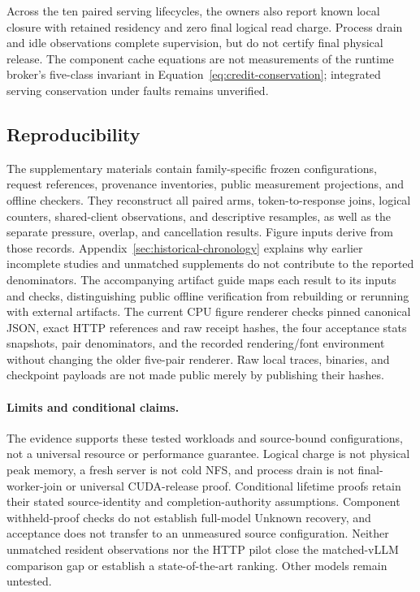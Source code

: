 Across the ten paired serving lifecycles, the owners also report known local
closure with retained residency and zero final logical read charge. Process
drain and idle observations complete supervision, but do not certify final
physical release. The component cache equations are not measurements of the
runtime broker's five-class invariant in
Equation~\ref{eq:credit-conservation}; integrated serving conservation under
faults remains unverified.

\subsection{Reproducibility}
The supplementary materials contain family-specific frozen configurations, request
references, provenance inventories, public measurement projections, and
offline checkers. They reconstruct all paired arms, token-to-response joins,
logical counters, shared-client observations, and descriptive resamples, as
well as the separate pressure, overlap, and cancellation results. Figure
inputs derive from those records. Appendix~\ref{sec:historical-chronology}
explains why earlier incomplete studies and unmatched supplements do not
contribute to the reported denominators. The accompanying artifact guide
maps each result to its inputs and checks, distinguishing public offline
verification from rebuilding or rerunning with external artifacts. The current
CPU figure renderer checks pinned canonical JSON, exact HTTP references and
raw receipt hashes, the four acceptance stats snapshots, pair denominators,
and the recorded rendering/font environment without changing the older
five-pair renderer. Raw local traces, binaries, and checkpoint payloads are
not made public merely by publishing their hashes.

\paragraph{Limits and conditional claims.}
The evidence supports these tested workloads and source-bound configurations,
not a universal resource or performance guarantee. Logical charge is not
physical peak memory, a fresh server is not cold NFS, and process drain is
not final-worker-join or universal CUDA-release proof. Conditional lifetime
proofs retain their stated source-identity and completion-authority
assumptions. Component withheld-proof checks do not establish full-model
Unknown recovery, and acceptance does not transfer to an unmeasured source
configuration. Neither unmatched resident observations nor the HTTP pilot
close the matched-vLLM comparison gap or establish a state-of-the-art
ranking. Other models remain untested.
